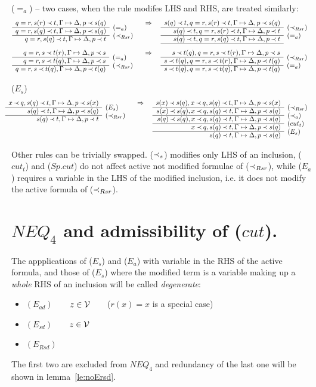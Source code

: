 \begin{PROOF}
\begin{LS}
\[{}
\]
\item ($=_a$) -- two cases, when the rule modifes LHS and RHS, are treated similarly:
\[
\prar{
q=r, s(r)\Incl t,\GSD, p\Incl s(q) \cl
q=r, s(q)\Incl t,\GSD, p\Incl s(q) & \rabove{(=_a)} \cl
q=r, s(q)\Incl t,\GSD, p\Incl t & \rabove{(\Rsr)} 
}
\conv
\prar{
s(q)\Incl t, q=r, s(r)\Incl t,\GSD, p\Incl s(q) \cl
s(q)\Incl t, q=r, s(r)\Incl t,\GSD, p\Incl t & \rabove{(\Rsr)} \cl
s(q)\Incl t, q=r, s(q)\Incl t,\GSD, p\Incl t & \rabove{(=_a)} \cl
}
\]
\[
\prar{
q=r, s\Incl t(r),\GSD, p\Incl s \cl
q=r, s\Incl t(q),\GSD, p\Incl s & \rabove{(=_a)} \cl
q=r, s\Incl t(q),\GSD, p\Incl t(q) & \rabove{(\Rsr)} 
}
\conv
\prar{
s\Incl t(q), q=r, s\Incl t(r),\GSD, p\Incl s \cl
s\Incl t(q), q=r, s\Incl t(r),\GSD, p\Incl t(q) & \rabove{(\Rsr)} \cl
s\Incl t(q), q=r, s\Incl t(q),\GSD, p\Incl t(q) & \rabove{(=_a)}
}
\]
\item ($E_s$)
\[
\hspace*{-1em}\prar{
x\Incl q, s(q)\Incl t,\GSD, p\Incl s(x) \cl
 s(q)\Incl t,\GSD, p\Incl s(q) & \rabove{(E_s)} \cl
 s(q)\Incl t,\GSD, p\Incl t & \rabove{(\Rsr)}
}
\conv
\prar{
s(x)\Incl s(q),x\Incl q, s(q)\Incl t,\GSD, p\Incl s(x) \cl
s(x)\Incl s(q),x\Incl q, s(q)\Incl t,\GSD, p\Incl s(q) & \rabove{(\Rsr)} \cl
s(q)\Incl s(q),x\Incl q, s(q)\Incl t,\GSD, p\Incl s(q) & \rabove{(\Incl_a)} \cl
x\Incl q, s(q)\Incl t,\GSD, p\Incl s(q) & \rabove{(cut_t)} \cl
s(q)\Incl t,\GSD, p\Incl s(q) & \rabove{(E_s)} 
}
\]
\item Other rules can be trivially swapped. ($\mathbin{\prec}_s$) modifies only LHS of
an inclusion, ($cut_t$) and ($Sp.cut$) do not affect active not modified formulae
of ($\mathbin{\prec}_{Rsr}$), while ($E_a$) requires a variable in the LHS of the modified 
inclusion, i.e. it does not modify the active formula of ($\mathbin{\prec}_{Rsr}$).
\end{LS}
\end{PROOF}
%
\section{$NEQ_4$ and admissibility of ($cut$).}
%
The appplications of ($E_s$) and ($E_a$) with variable in the RHS
of the active formula, and those of ($E_s$) where the modified term is 
a variable making up a {\em whole} RHS of an inclusion will be called {\em degenerate}:
\begin{itemize}\MyLPar
\item $(E_{ad})$\ \ \ \
 $z\in{\cal V}$\ \ \ \ ($r(x)=x$ is a special case)
\item $(E_{sd})$\ \ \ \
 $z\in{\cal V}$
\item $(E_{Rsd})$\ \ 
\end{itemize}
The first two are excluded from $NEQ_4$ and redundancy of the last one will be
shown in lemma~\ref{le:noErsd}.

